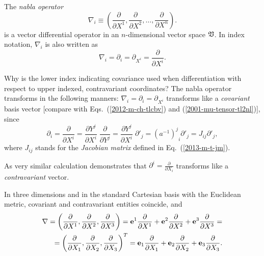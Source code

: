 The {\em nabla operator}
\begin{equation}
\nabla_i \equiv \left(
\frac{\partial }{\partial X^1},
\frac{\partial }{\partial X^2},
\ldots ,
\frac{\partial }{\partial X^n}
\right).
\end{equation}
is a vector differential operator in an $n$-dimensional vector space $\frak V$.
In index notation, $\nabla_i$ is also written as
\begin{equation}
\nabla_i  =\partial_i =\partial_{X^i}
= \frac{\partial }{\partial X^i}
.
\end{equation}

Why is the lower index indicating covariance used when differentiation with respect to upper indexed, contravariant coordinates?
The nabla operator transforms in the following manners:
$\nabla_i  =\partial_i =\partial_{X^i}$ transforms like a {\em covariant} basis vector
[compare with Eqs.~(\ref{2012-m-ch-tlcbv}) and (\ref{2001-mu-tensor-tl2nl})], since
\begin{equation}
\partial_i =
\frac{\partial }{\partial X^i}
=
\frac{\partial { Y }^j}{\partial X^i}
\;
\frac{\partial }{\partial { Y }^j}
=
\frac{\partial { Y }^j}{\partial X^i}
\;
\partial'_j
=
{{(a^{-1})}^j}_i
\partial'_j
=
J_{ij}
\partial'_j,
\end{equation}
where $J_{ij}$ stands for the {\em  Jacobian matrix} defined in Eq.~(\ref{2013-m-t-jm}).

As very similar calculation demonstrates that $\partial^i=\frac{\partial }{\partial X_i}$ transforms like a {\em contravariant} vector.


In three dimensions and in the standard Cartesian basis with the Euclidean metric,
covariant and contravariant entities coincide,
and
\begin{equation}
\begin{split}
\nabla
=
\left(
\frac{\partial }{\partial X^1},
\frac{\partial }{\partial X^2},
\frac{\partial }{\partial X^3}
\right)
={\bf e}^1\frac{\partial }{\partial X^1}
+{\bf e}^2\frac{\partial }{\partial X^2}
+{\bf e}^3\frac{\partial }{\partial X^3}
=
\\
= \left(
\frac{\partial }{\partial X_1},
\frac{\partial }{\partial X_2},
\frac{\partial }{\partial X_3}
\right)^T
={\bf e}_1\frac{\partial }{\partial X_1}
+{\bf e}_2\frac{\partial }{\partial X_2}
+{\bf e}_3\frac{\partial }{\partial X_3}
.
\end{split}
\end{equation}

